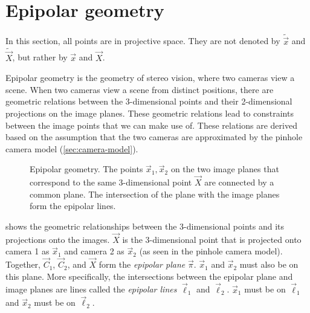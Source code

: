 \section{Epipolar geometry}

\begin{remark}
    In this section, all points are in projective space. They are not denoted by
    $\tilde{\vec{x}}$ and $\tilde{\vec{X}}$, but rather by $\vec{x}$ and
    $\vec{X}$.
\end{remark}

Epipolar geometry is the geometry of stereo vision, where two cameras view a
scene. When two cameras view a scene from distinct positions, there are
geometric relations between the 3-dimensional points and their 2-dimensional
projections on the image planes. These geometric relations lead to constraints
between the image points that we can make use of. These relations are derived
based on the assumption that the two cameras are approximated by the pinhole
camera model (\cref{sec:camera-model}).

\begin{figure}[h!]
    \centering
    \caption{Epipolar geometry. The points $\vec{x}_1,\vec{x}_2$ on the two image planes that correspond to the same 3-dimensional point $\vec{X}$ are connected by a common plane. The intersection of the plane with the image planes form the epipolar lines.}
    \label{fig:epipolar-geometry}
\end{figure}

 shows the geometric relationships between the
3-dimensional points and its projections onto the images. $\vec{X}$ is the
3-dimensional point that is projected onto camera 1 as $\vec{x}_1$ and camera 2
as $\vec{x}_2$ (as seen in the pinhole camera model). Together, $\vec{C}_1$,
$\vec{C}_2$, and $\vec{X}$ form the \textit{epipolar plane} $\vec{\pi}$.
$\vec{x}_1$ and $\vec{x}_2$ must also be on this plane. More specifically, the
intersections between the epipolar plane and image planes are lines called the
\textit{epipolar lines} $\vec{\ell}_1$ and $\vec{\ell}_2$. $\vec{x}_1$ must be
on $\vec{\ell}_1$ and $\vec{x}_2$ must be on $\vec{\ell}_2$.

